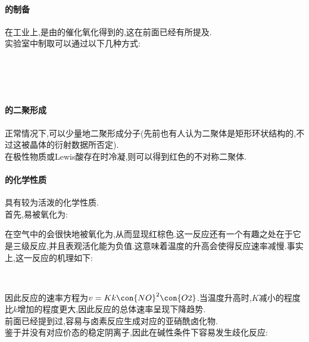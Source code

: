 \documentclass{ctexart}
\begin{document}
\paragraph{的制备}
在工业上,是由的催化氧化得到的,这在前面已经有所提及.\\
\indent 实验室中制取可以通过以下几种方式:
\begin{center}
    \\
    \\
    \\
\end{center}
\paragraph{的二聚形成}
正常情况下,可以少量地二聚形成分子(先前也有人认为二聚体是矩形环状结构的,不过这被晶体的衍射数据所否定).\\
\indent 在极性物质或Lewis酸存在时冷凝,则可以得到红色的不对称二聚体.
\paragraph{的化学性质}
具有较为活泼的化学性质.\\
\indent 首先,易被氧化为:
\begin{center}
\end{center}
在空气中的会很快地被氧化为,从而显现红棕色.这一反应还有一个有趣之处在于它是三级反应,并且表观活化能为负值.这意味着温度的升高会使得反应速率减慢.事实上,这一反应的机理如下:
\begin{center}
    \\
\end{center}
因此反应的速率方程为$v=Kk\con{NO}^2\con{O2}$.当温度升高时,$K$减小的程度比$k$增加的程度更大,因此反应的总体速率呈现下降趋势.\\
\indent 前面已经提到过,容易与卤素反应生成对应的亚硝酰卤化物.\\
\indent 鉴于并没有对应价态的稳定阴离子,因此在碱性条件下容易发生歧化反应:
\begin{center}
    \\
    \\
\end{center}
\end{document}
